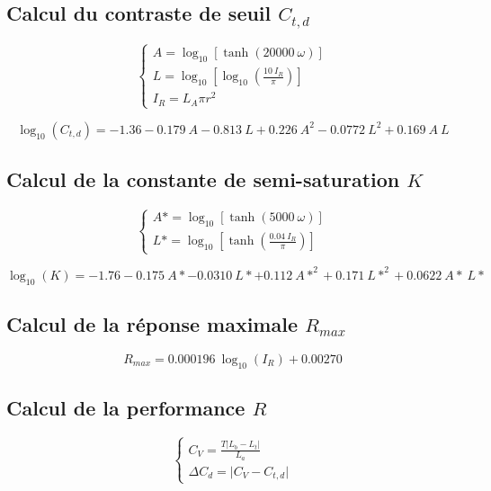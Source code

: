 	\subsection*{Calcul du contraste de seuil $C_{t,d}$}		
	\begin{equation}
		\begin{cases}
			A = \log_{10} \left[ \tanh(20000~\omega) \right]\\
			L = \log_{10} \left[ \log_{10} \left( \frac{10~I_R}{\pi} \right) \right]\\
			I_R = L_A \pi r^2
		\end{cases}
		\label{eq:anxe_step_10}
	\end{equation}
	
	\begin{equation}
		\log_{10}(C_{t,d}) = -1.36 -0.179~A - 0.813~L + 0.226~A^2 - 0.0772~L^2 + 0.169~A~L
		\label{eq:anxe_step_11}
	\end{equation}
	
	\subsection*{Calcul de la constante de semi-saturation $K$}	
	\begin{equation}
		\begin{cases}
			A\ast = \log_{10} \left[ \tanh(5000~\omega) \right]\\
			L\ast = \log_{10} \left[ \tanh \left( \frac{0.04~I_R}{\pi} \right) \right]
		\end{cases}
		\label{eq:anxe_step_20}
	\end{equation}
	
	\begin{equation}
		\log_{10}(K) = -1.76 -0.175~A\ast - 0.0310~L\ast + 0.112~A\ast^2 + 0.171~L\ast^2 + 0.0622~A\ast~L\ast
		\label{eq:anxe_step_21}
	\end{equation}
	
	\subsection*{Calcul de la réponse maximale $R_{max}$}	
	\begin{equation}
		R_{max} = 0.000196~\log_{10}(I_R) + 0.00270
		\label{eq:anxe_step_30}
	\end{equation}
	
	\subsection*{Calcul de la performance $R$}	
	\begin{equation}
		\begin{cases}
		C_V = \frac{T \vert L_b - L_t \vert}{L_a}\\		
		\Delta C_d = \vert C_V - C_{t,d} \vert
		\end{cases}
		\label{eq:anxe_step_40}
	\end{equation}
	
